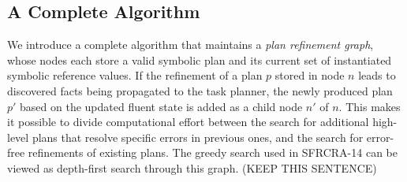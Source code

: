 \subsection{A Complete Algorithm}
We introduce a complete algorithm that maintains a \emph{plan refinement graph}, whose
nodes each store a valid symbolic plan and its current set of
instantiated symbolic reference values. If the refinement of a plan $p$ stored in
node $n$ leads to discovered facts being propagated to the task
planner, the newly produced plan $p'$ based on the updated fluent
state is added as a child node $n'$ of $n$. This makes it possible to
divide computational effort between the search for additional
high-level plans that resolve specific errors in previous ones, and
the search for error-free refinements of existing plans.
The greedy search used in SFRCRA-14 can be viewed as depth-first search
through this graph. (KEEP THIS SENTENCE)

